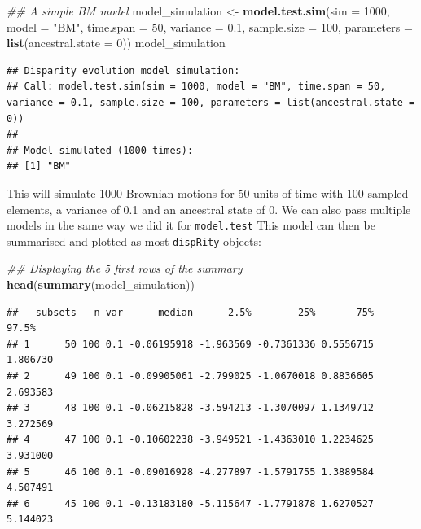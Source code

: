 \documentclass[
]{book}
\newenvironment{Shaded}{\begin{snugshade}}{\end{snugshade}}
\newcommand{\CommentTok}[1]{\textcolor[rgb]{0.56,0.35,0.01}{\textit{#1}}}
\newcommand{\DataTypeTok}[1]{\textcolor[rgb]{0.13,0.29,0.53}{#1}}
\newcommand{\DecValTok}[1]{\textcolor[rgb]{0.00,0.00,0.81}{#1}}
\newcommand{\FloatTok}[1]{\textcolor[rgb]{0.00,0.00,0.81}{#1}}
\newcommand{\KeywordTok}[1]{\textcolor[rgb]{0.13,0.29,0.53}{\textbf{#1}}}
\newcommand{\NormalTok}[1]{#1}
\newcommand{\StringTok}[1]{\textcolor[rgb]{0.31,0.60,0.02}{#1}}
\begin{document}
\begin{Shaded}
\begin{Highlighting}[]
\CommentTok{\#\# A simple BM model}
\NormalTok{model\_simulation \textless{}{-}}\StringTok{ }\KeywordTok{model.test.sim}\NormalTok{(}\DataTypeTok{sim =} \DecValTok{1000}\NormalTok{, }\DataTypeTok{model =} \StringTok{"BM"}\NormalTok{,}
                                   \DataTypeTok{time.span =} \DecValTok{50}\NormalTok{, }\DataTypeTok{variance =} \FloatTok{0.1}\NormalTok{,}
                                   \DataTypeTok{sample.size =} \DecValTok{100}\NormalTok{,}
                                   \DataTypeTok{parameters =} \KeywordTok{list}\NormalTok{(}\DataTypeTok{ancestral.state =} \DecValTok{0}\NormalTok{))}
\NormalTok{model\_simulation}
\end{Highlighting}
\end{Shaded}

\begin{verbatim}
## Disparity evolution model simulation:
## Call: model.test.sim(sim = 1000, model = "BM", time.span = 50, variance = 0.1, sample.size = 100, parameters = list(ancestral.state = 0)) 
## 
## Model simulated (1000 times):
## [1] "BM"
\end{verbatim}

This will simulate 1000 Brownian motions for 50 units of time with 100 sampled elements, a variance of 0.1 and an ancestral state of 0.
We can also pass multiple models in the same way we did it for \texttt{model.test}
This model can then be summarised and plotted as most \texttt{dispRity} objects:

\begin{Shaded}
\begin{Highlighting}[]
\CommentTok{\#\# Displaying the 5 first rows of the summary}
\KeywordTok{head}\NormalTok{(}\KeywordTok{summary}\NormalTok{(model\_simulation))}
\end{Highlighting}
\end{Shaded}

\begin{verbatim}
##   subsets   n var      median      2.5%        25%       75%    97.5%
## 1      50 100 0.1 -0.06195918 -1.963569 -0.7361336 0.5556715 1.806730
## 2      49 100 0.1 -0.09905061 -2.799025 -1.0670018 0.8836605 2.693583
## 3      48 100 0.1 -0.06215828 -3.594213 -1.3070097 1.1349712 3.272569
## 4      47 100 0.1 -0.10602238 -3.949521 -1.4363010 1.2234625 3.931000
## 5      46 100 0.1 -0.09016928 -4.277897 -1.5791755 1.3889584 4.507491
## 6      45 100 0.1 -0.13183180 -5.115647 -1.7791878 1.6270527 5.144023
\end{verbatim}
\end{document}
